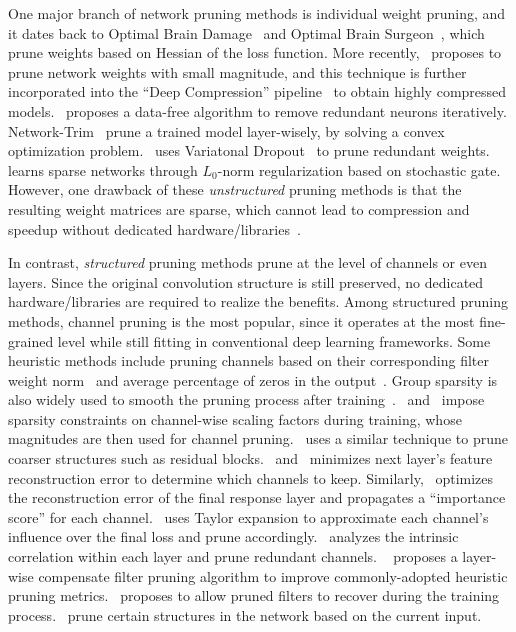 One major branch of network pruning methods is individual weight pruning, and it dates back to Optimal Brain Damage~\cite{obd} and Optimal Brain Surgeon~\cite{obs}, which prune weights based on Hessian of the loss function. More recently,~\cite{han2015learning} proposes to prune network weights with small magnitude, and this technique is further incorporated into the ``Deep Compression'' pipeline~\cite{han2015deep} to obtain highly compressed models.~\cite{datafree} proposes a data-free algorithm to remove redundant neurons iteratively. Network-Trim~\cite{trim} prune a trained model layer-wisely, by solving a convex optimization problem.~\cite{vdropout} uses  Variatonal Dropout~\cite{vdropoutorg} to prune redundant weights.~\cite{l0sparse} learns sparse networks through $L_0$-norm regularization based on stochastic gate. 
However, one drawback of these \emph{unstructured} pruning methods is that the resulting weight matrices are sparse, which cannot lead to compression and speedup without dedicated hardware/libraries~\cite{han2016eie}. 


In contrast, \emph{structured} pruning methods prune at the level of channels or even layers. Since the original convolution structure is still preserved, no dedicated hardware/libraries are required to realize the benefits. Among structured pruning methods, channel pruning is the most popular, since it operates at the most fine-grained level while still fitting in conventional deep learning frameworks. Some heuristic methods include pruning channels based on their corresponding filter weight norm~\cite{li2016pruning} and average percentage of zeros in the output~\cite{trimming}. Group sparsity is also widely used to smooth the pruning process after training~\cite{wen2016learning, gs1, gs2, gs3}.~\cite{liu2017learning} and~\cite{ye2018rethinking} impose  sparsity constraints on channel-wise scaling factors during training, whose magnitudes are then used for channel pruning.~\cite{huang2018data} uses a similar technique to prune coarser structures such as residual blocks.~\cite{he2017channel} and~\cite{luo2017thinet} minimizes next layer's feature reconstruction error to determine which channels to keep. Similarly,~\cite{nisp} optimizes the reconstruction error of the final response layer and propagates a ``importance score'' for each channel.~\cite{nvidia} uses Taylor expansion to approximate each channel's influence over the final loss and prune accordingly.~\cite{pfa} analyzes the intrinsic correlation within each layer and prune redundant channels. ~\cite{chin2018layer} proposes a layer-wise compensate filter pruning algorithm to improve commonly-adopted heuristic pruning metrics.~\cite{he2018sfp} proposes to allow pruned filters to recover during the training process.~\cite{lin2017runtime, wang2018skipnet} prune certain structures in the network based on the current input.

